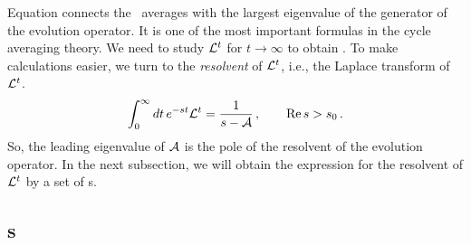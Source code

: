 Equation  connects the \spt\ averages with the
largest eigenvalue of the generator of the evolution operator. It is
one of the most important formulas in the cycle averaging theory.
We need to study $\mathcal{L}^t$ for $t\to \infty$ to obtain .
To make calculations easier,
we turn to the \emph{resolvent} of $\mathcal{L}^t$, i.e., the Laplace transform
of $\mathcal{L}^t$.
\begin{equation}
  \label{eq:resolv}
  \int_0^\infty dt \, e^{-st} \mathcal{L}^t
        = {1 \over s - \mathcal{A}} \,,\quad\quad   \mathrm{Re}\, s > s_0
        \,.
\end{equation}
So, the leading eigenvalue of $\mathcal{A}$ is the pole of the resolvent of the evolution
operator. In the next subsection, we will obtain the expression for the resolvent
of $\mathcal{L}^t$ by a set of \po s.

\subsection{\FD s}
\label{sec:det}

